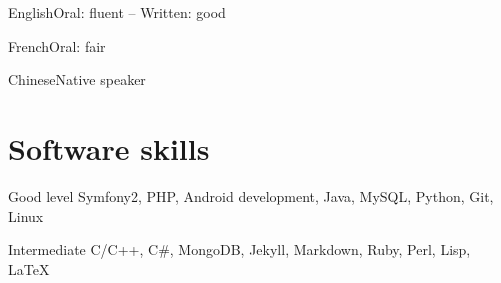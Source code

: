 \documentclass{tccv}
\begin{document}
\begin{factlist}
\item{English}{Oral: fluent -- Written: good}
\item{French}{Oral: fair}
\item{Chinese}{Native speaker}
\end{factlist}

\section{Software skills}

\begin{factlist}

\item{Good level}
     {Symfony2, PHP, Android development, Java, MySQL, Python, Git, Linux}

\item{Intermediate}
     {C/C++, C\#, MongoDB, Jekyll, Markdown, Ruby, Perl, Lisp, LaTeX}

\end{factlist}
\end{document}
